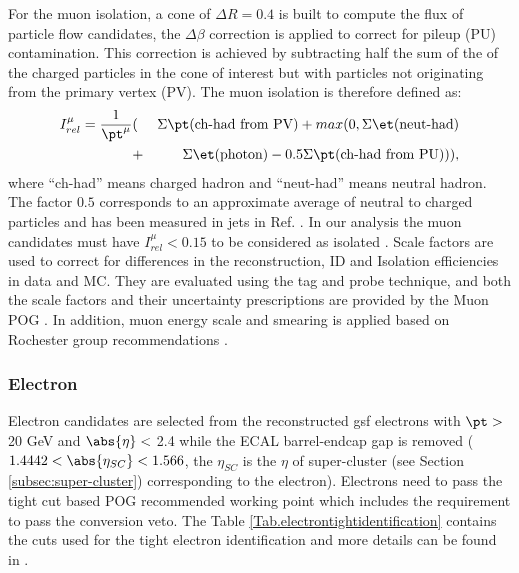For the muon isolation, a cone of $\Delta R = 0.4$ is built to
compute the flux of particle flow candidates, the $\Delta\beta$ correction is applied to correct
for pileup (PU) contamination. This correction is achieved by subtracting half the sum of the \pt of
the charged particles in the cone of interest but with particles not originating from the primary
vertex (PV).
The muon isolation is therefore defined as:
\begin{eqnarray}
\label{eq:Irel}
I_{rel}^{\mu} = \frac{1}{\pt^{\mu}} &(&\Sigma \pt(\text{ch-had from PV}) + max(0,\Sigma \et(\text{neut-had}) \nonumber \\
&+&  \Sigma \et(\text{photon}) - 0.5 \Sigma \pt(\text{ch-had from PU}))),
\end{eqnarray}
where ``ch-had'' means charged hadron and ``neut-had'' means neutral hadron.
The factor $0.5$ corresponds to an approximate average of neutral to charged particles and has
been measured in jets in Ref. \cite{CMS:2010eua}. In our analysis the muon candidates must have $I_{rel}^{\mu}<0.15$ to be
considered as isolated \cite{muonid}.
Scale factors are used to correct for differences in the reconstruction, ID and Isolation efficiencies in data and MC. They are evaluated using the tag and probe technique, and both
the scale factors and their uncertainty prescriptions are provided by the Muon POG \cite{muonsf}.
In addition, muon energy scale and smearing is applied  based on Rochester group  recommendations \cite{Rochester}.


\subsubsection{Electron}

Electron candidates are selected from the reconstructed gsf electrons with  $ \pt>$ 20 GeV and $\abs{\eta}<$ 2.4 while the ECAL barrel-endcap gap is removed ($1.4442 < \abs{\eta_{SC}}< 1.566$, the $\eta_{SC}$ is the $\eta$ of super-cluster (see Section \ref{subsec:super-cluster}) corresponding to the electron).
Electrons need to pass the tight cut based POG recommended working point \cite{eleid} which includes the requirement to pass the conversion veto.
The Table \ref{Tab.electrontightidentification} contains the cuts used for the tight electron identification and more details can be found in \cite{eleid}.

